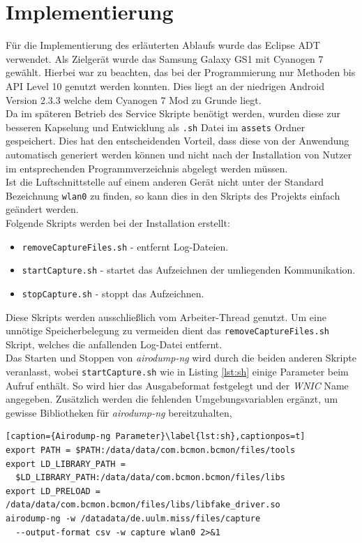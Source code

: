\documentclass[]{report}
\begin{document}
\section{Implementierung}
Für die Implementierung des erläuterten Ablaufs wurde das Eclipse ADT \cite{ADT} verwendet. Als Zielgerät wurde das Samsung Galaxy GS1 \cite{S1} mit Cyanogen 7 gewählt. Hierbei war zu beachten, das bei der Programmierung nur Methoden bis API Level 10 genutzt werden konnten. Dies liegt an der niedrigen Android Version 2.3.3 welche dem Cyanogen 7 Mod zu Grunde liegt. \\
Da im späteren Betrieb des Service Skripte benötigt werden, wurden diese zur besseren Kapselung und Entwicklung als \texttt{.sh} Datei im \texttt{assets} Ordner gespeichert. Dies hat den entscheidenden Vorteil, dass diese von der Anwendung automatisch generiert werden können und nicht nach der Installation von Nutzer im entsprechenden Programmverzeichnis abgelegt werden müssen.\\ Ist die Luftschnittstelle auf einem anderen Gerät nicht unter der Standard Bezeichnung \texttt{wlan0} zu finden, so kann dies in den Skripts des Projekts einfach geändert werden. \\ 
Folgende Skripts werden bei der Installation erstellt:
\begin{itemize}
\item \texttt{removeCaptureFiles.sh} - entfernt Log-Dateien.
\item \texttt{startCapture.sh} - startet das Aufzeichnen der umliegenden Kommunikation.
\item \texttt{stopCapture.sh} - stoppt das Aufzeichnen.
\end{itemize}
Diese Skripts werden ausschließlich vom Arbeiter-Thread genutzt. Um eine unnötige Speicherbelegung zu vermeiden dient das \texttt{removeCaptureFiles.sh} Skript, welches die anfallenden Log-Datei entfernt. \\ Das Starten und Stoppen von \textit{airodump-ng} wird durch die beiden anderen Skripte veranlasst, wobei \texttt{startCapture.sh} wie in Listing \ref{lst:sh} einige Parameter beim Aufruf enthält. So wird hier das Ausgabeformat festgelegt und der \textit{WNIC} Name angegeben. Zusätzlich werden die fehlenden Umgebungsvariablen ergänzt, um gewisse Bibliotheken für \textit{airodump-ng} bereitzuhalten,
\begin{lstlisting}[caption={Airodump-ng Parameter}\label{lst:sh},captionpos=t] 
export PATH = $PATH:/data/data/com.bcmon.bcmon/files/tools
export LD_LIBRARY_PATH = 
  $LD_LIBRARY_PATH:/data/data/com.bcmon.bcmon/files/libs
export LD_PRELOAD = /data/data/com.bcmon.bcmon/files/libs/libfake_driver.so
airodump-ng -w /datadata/de.uulm.miss/files/capture 
  --output-format csv -w capture wlan0 2>&1
 \end{lstlisting}
\end{document}
